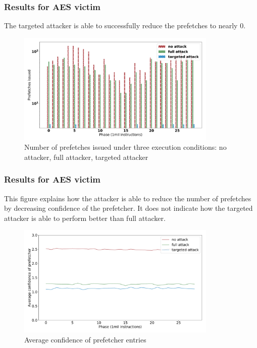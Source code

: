 \documentclass[10pt,usenames,dvipsnames]{beamer}
\begin{document}
\begin{frame}
\frametitle{Results for AES victim}
The targeted attacker is able to successfully reduce the prefetches to nearly 0.
\begin{figure}[ht]
    \centering
    \includegraphics[width=0.85\textwidth]{pf_issued}
    \caption{Number of prefetches issued under three execution conditions: no attacker, full attacker, targeted attacker}
\end{figure}
\end{frame}

\begin{frame}
\frametitle{Results for AES victim}
This figure explains how the attacker is able to reduce the number of prefetches by decreasing
confidence of the prefetcher. It does not indicate how the targeted attacker is able to perform
better than full attacker.
\begin{figure}[ht]
    \centering
    \includegraphics[width=0.85\textwidth]{avg_conf}
    \caption{Average confidence of prefetcher entries}
    \label{fig:prefetch_attack}
\end{figure}
\end{frame}
\end{document}
